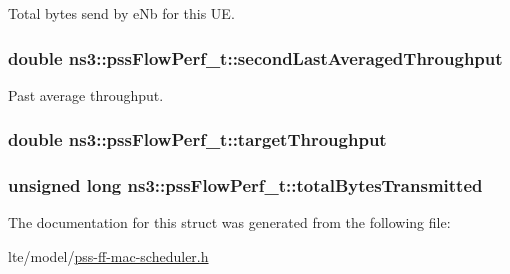 Total bytes send by e\+Nb for this UE. 

\subsubsection[{\texorpdfstring{second\+Last\+Averaged\+Throughput}{secondLastAveragedThroughput}}]{\setlength{\rightskip}{0pt plus 5cm}double ns3\+::pss\+Flow\+Perf\+\_\+t\+::second\+Last\+Averaged\+Throughput}\hypertarget{structns3_1_1pssFlowPerf__t_a068b7fbb57d8c595a95c8a44711ffbaf}{}\label{structns3_1_1pssFlowPerf__t_a068b7fbb57d8c595a95c8a44711ffbaf}


Past average throughput. 

\subsubsection[{\texorpdfstring{target\+Throughput}{targetThroughput}}]{\setlength{\rightskip}{0pt plus 5cm}double ns3\+::pss\+Flow\+Perf\+\_\+t\+::target\+Throughput}\hypertarget{structns3_1_1pssFlowPerf__t_a286efb21612af3262ba1a9305d1f4fc8}{}\label{structns3_1_1pssFlowPerf__t_a286efb21612af3262ba1a9305d1f4fc8}
\subsubsection[{\texorpdfstring{total\+Bytes\+Transmitted}{totalBytesTransmitted}}]{\setlength{\rightskip}{0pt plus 5cm}unsigned {\bf long} ns3\+::pss\+Flow\+Perf\+\_\+t\+::total\+Bytes\+Transmitted}\hypertarget{structns3_1_1pssFlowPerf__t_adaf2b2fc1531f7785559a6b848628aa7}{}\label{structns3_1_1pssFlowPerf__t_adaf2b2fc1531f7785559a6b848628aa7}


The documentation for this struct was generated from the following file\+:\begin{DoxyCompactItemize}
\item 
lte/model/\hyperlink{lte_2model_2pss-ff-mac-scheduler_8h}{pss-\/ff-\/mac-\/scheduler.\+h}\end{DoxyCompactItemize}
